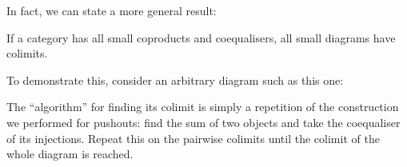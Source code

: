In fact, we can state a more general result:

\begin{proposition}
If a category has all small coproducts and coequalisers, all small diagrams have colimits.
\end{proposition}

To demonstrate this, consider an arbitrary diagram such as this one:

\begin{center}
\end{center}

The ``algorithm'' for finding its colimit is simply a repetition of the construction we performed for pushouts: find the sum of two objects and take the coequaliser of its injections. Repeat this on the pairwise colimits until the colimit of the whole diagram is reached.

\begin{center}
\begin{minipage}{0.23\textwidth}


\end{minipage}\hfill\vline\hfill%
\begin{minipage}{0.33\textwidth}


\end{minipage}\hfill\vline\hfill%
\begin{minipage}{0.4\textwidth}


\end{minipage}
\end{center}
